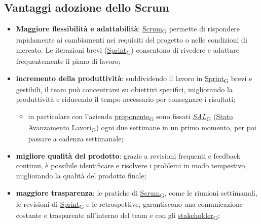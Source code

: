\subsection{Vantaggi adozione dello Scrum}
\begin{itemize}
	\item \textbf{Maggiore flessibilità e adattabilità}: \href{https://7last.github.io/docs/rtb/documentazione-interna/glossario\#scrum}{Scrum\textsubscript{G}} permette di rispondere rapidamente ai cambiamenti nei requisiti del progetto o nelle condizioni di mercato. Le iterazioni brevi (\href{https://7last.github.io/docs/rtb/documentazione-interna/glossario\#sprint}{Sprint\textsubscript{G}}) consentono di rivedere e adattare frequentemente il piano di lavoro;
	\item \textbf{incremento della produttività}: suddividendo il lavoro in \href{https://7last.github.io/docs/rtb/documentazione-interna/glossario\#sprint}{Sprint\textsubscript{G}} brevi e gestibili, il team può concentrarsi su obiettivi specifici, migliorando la produttività e riducendo il tempo necessario per consegnare i risultati;
	      \begin{itemize}
		      \item in particolare con l’azienda \href{https://7last.github.io/docs/rtb/documentazione-interna/glossario\#proponente}{proponente\textsubscript{G}} sono fissati \href{https://7last.github.io/docs/rtb/documentazione-interna/glossario\#stato-avanzamento-lavori}{\textit{SAL}\textsubscript{G}} (\href{https://7last.github.io/docs/rtb/documentazione-interna/glossario\#stato-avanzamento-lavori}{Stato Avanzamento Lavori\textsubscript{G}}) ogni due settimane in un primo momento, per poi passare a cadenza settimanale;
	      \end{itemize}
	\item \textbf{migliore qualità del prodotto}: grazie a revisioni frequenti e feedback continui, è possibile identificare e risolvere i problemi in modo tempestivo, migliorando la qualità del prodotto finale;
	\item \textbf{maggiore trasparenza}: le pratiche di \href{https://7last.github.io/docs/rtb/documentazione-interna/glossario\#scrum}{Scrum\textsubscript{G}}, come le riunioni settimanali, le revisioni di \href{https://7last.github.io/docs/rtb/documentazione-interna/glossario\#sprint}{Sprint\textsubscript{G}} e le retrospettive, garantiscono una comunicazione costante e trasparente all'interno del team e con gli \href{https://7last.github.io/docs/rtb/documentazione-interna/glossario\#stakeholder}{stakeholder\textsubscript{G}};

\end{itemize}
